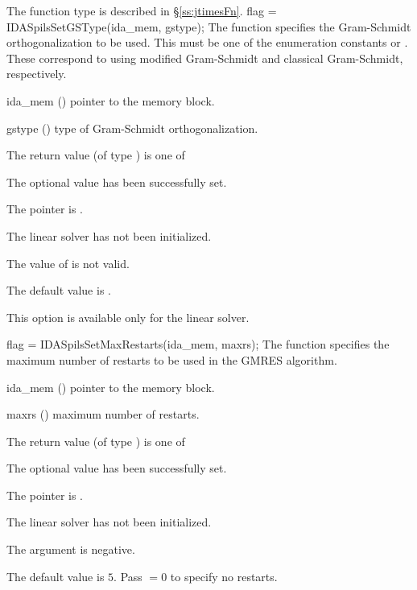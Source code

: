 {{  The function type  is described in \S\ref{ss:jtimesFn}.
}
{
  flag = IDASpilsSetGSType(ida\_mem, gstype);
}
{
  The function  specifies the 
  Gram-Schmidt orthogonalization to be used. 
  This must be one of the enumeration constants 
  or . These correspond to using modified Gram-Schmidt 
  and classical Gram-Schmidt, respectively. 
}
{
  \begin{args}
  \item[ida\_mem] ()
    pointer to the {\ida} memory block.
  \item[gstype] ()
    type of Gram-Schmidt orthogonalization.
  \end{args}
}
{
  The return value  (of type ) is one of
  \begin{args}
  \item[\Id{IDASPILS\_SUCCESS}] 
    The optional value has been successfully set.
  \item[\Id{IDASPILS\_MEM\_NULL}]
    The  pointer is .
  \item[\Id{IDASPILS\_LMEM\_NULL}]
    The {\idaspils} linear solver has not been initialized.
  \item[\Id{IDASPILS\_ILL\_INPUT}]
    The value of  is not valid.
  \end{args}
}
{
  The default value is .

  {\warn}This option is available only for the {\idaspgmr} linear solver.
}
{
  flag = IDASpilsSetMaxRestarts(ida\_mem, maxrs);
}
{
  The function  specifies the maximum number of 
  restarts to be used in the GMRES algorithm.
}
{
  \begin{args}
  \item[ida\_mem] ()
    pointer to the {\ida} memory block.
  \item[maxrs] ()
    maximum number of restarts.
  \end{args}
}
{
  The return value  (of type ) is one of
  \begin{args}
  \item[\Id{IDASPILS\_SUCCESS}] 
    The optional value has been successfully set.
  \item[\Id{IDASPILS\_MEM\_NULL}]
    The  pointer is .
  \item[\Id{IDASPILS\_LMEM\_NULL}]
    The {\idaspils} linear solver has not been initialized.
  \item[\Id{IDASPILS\_ILL\_INPUT}]
    The  argument is negative.
  \end{args}
}
{
  The default value is $5$. Pass  $=0$ to specify no restarts.

}}

